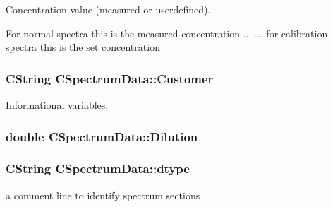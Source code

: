 Concentration value (measured or userdefined). 

For normal spectra this is the measured concentration ... ... for calibration spectra this is the set concentration \hypertarget{classCSpectrumData_a18b8196a9ce67e89ba7a807b253ab003}{
\subsubsection[{Customer}]{\setlength{\rightskip}{0pt plus 5cm}CString {\bf CSpectrumData::Customer}}}
\label{classCSpectrumData_a18b8196a9ce67e89ba7a807b253ab003}


Informational variables. 

\hypertarget{classCSpectrumData_ad4ff25d2211aa22c4d4d1de8c7a99603}{
\subsubsection[{Dilution}]{\setlength{\rightskip}{0pt plus 5cm}double {\bf CSpectrumData::Dilution}}}
\label{classCSpectrumData_ad4ff25d2211aa22c4d4d1de8c7a99603}
\hypertarget{classCSpectrumData_a1b8b73035641724a1ba9b3f9d05c4299}{
\subsubsection[{dtype}]{\setlength{\rightskip}{0pt plus 5cm}CString {\bf CSpectrumData::dtype}}}
\label{classCSpectrumData_a1b8b73035641724a1ba9b3f9d05c4299}


a comment line to identify spectrum sections 

